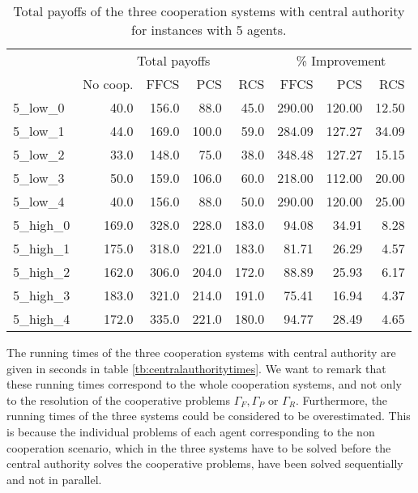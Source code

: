 \documentclass{article}
\begin{document}
\begin{table}[ht!]
\centering
\caption{Total payoffs of the three cooperation systems with central authority for instances with 5 agents. \label{tb:centralauthoritypayoff}}
\begin{tabular}{lrrrrrrr}
\toprule
 & \multicolumn{4}{c|}{Total payoffs} & \multicolumn{3}{c}{\% Improvement}\\
 & No coop.  &  FFCS &   PCS &  \multicolumn{1}{r|}{RCS} &   FFCS &   PCS &  RCS \\
\midrule
5\_low\_0  & 40.0  & 156.0 & 88.0  & 45.0  & 290.00 & 120.00 & 12.50 \\
5\_low\_1  & 44.0  & 169.0 & 100.0 & 59.0  & 284.09 & 127.27 & 34.09 \\
5\_low\_2  & 33.0  & 148.0 & 75.0  & 38.0  & 348.48 & 127.27 & 15.15 \\
5\_low\_3  & 50.0  & 159.0 & 106.0 & 60.0  & 218.00 & 112.00 & 20.00 \\
5\_low\_4  & 40.0  & 156.0 & 88.0  & 50.0  & 290.00 & 120.00 & 25.00 \\
5\_high\_0 & 169.0 & 328.0 & 228.0 & 183.0 & 94.08  & 34.91  & 8.28  \\
5\_high\_1 & 175.0 & 318.0 & 221.0 & 183.0 & 81.71  & 26.29  & 4.57  \\
5\_high\_2 & 162.0 & 306.0 & 204.0 & 172.0 & 88.89  & 25.93  & 6.17  \\
5\_high\_3 & 183.0 & 321.0 & 214.0 & 191.0 & 75.41  & 16.94  & 4.37  \\
5\_high\_4 & 172.0 & 335.0 & 221.0 & 180.0 & 94.77  & 28.49  & 4.65 \\
\bottomrule
\end{tabular}
\end{table}

The running times of the three cooperation systems with central authority are given in seconds in table \ref{tb:centralauthoritytimes}. We want to remark that these running times correspond to the whole cooperation systems, and not only to the resolution of the cooperative problems $\Gamma_F,\Gamma_P$ or $\Gamma_R$. Furthermore, the running times of the three systems could be considered to be overestimated. This is because the individual problems of each agent corresponding to the non cooperation scenario, which in the three systems have to be solved before the central authority solves the cooperative problems, have been solved sequentially and not in parallel. 
\end{document}
